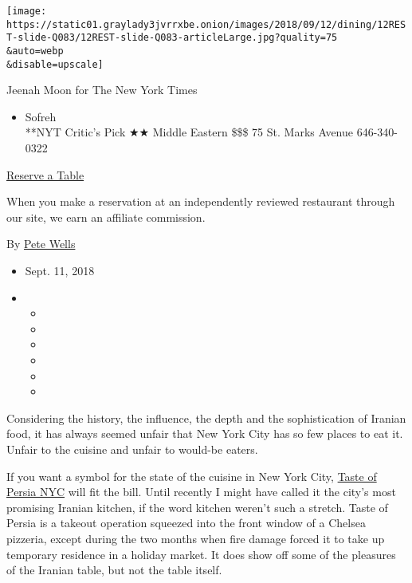\texttt{[image: https://static01.graylady3jvrrxbe.onion/images/2018/09/12/dining/12REST-slide-Q083/12REST-slide-Q083-articleLarge.jpg?quality=75\\\&auto=webp\\\&disable=upscale]}

Jeenah Moon for The New York Times

\begin{itemize}
\tightlist
\item
  Sofreh\\
  **NYT Critic's Pick ★★ Middle Eastern \$\$\$ 75 St. Marks Avenue
  646-340-0322
\end{itemize}

\href{https://www.opentable.com/single.aspx?ref=4201\&rid=1021087}{Reserve
a Table}

When you make a reservation at an independently reviewed restaurant
through our site, we earn an affiliate commission.

By \href{https://www.nytimes3xbfgragh.onion/by/pete-wells}{Pete Wells}

\begin{itemize}
\item
  Sept. 11, 2018
\item
  \begin{itemize}
  \item
  \item
  \item
  \item
  \item
  \item
  \end{itemize}
\end{itemize}

Considering the history, the influence, the depth and the sophistication
of Iranian food, it has always seemed unfair that New York City has so
few places to eat it. Unfair to the cuisine and unfair to would-be
eaters.

If you want a symbol for the state of the cuisine in New York City,
\href{https://www.nytimes3xbfgragh.onion/2013/09/04/dining/reviews/hungry-city-taste-of-persia-nyc-in-flatiron.html}{Taste
of Persia NYC} will fit the bill. Until recently I might have called it
the city's most promising Iranian kitchen, if the word kitchen weren't
such a stretch. Taste of Persia is a takeout operation squeezed into the
front window of a Chelsea pizzeria, except during the two months when
fire damage forced it to take up temporary residence in a holiday
market. It does show off some of the pleasures of the Iranian table, but
not the table itself.

